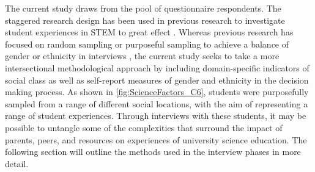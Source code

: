 The current study draws from the pool of questionnaire respondents. The staggered research design has been used in previous research to investigate student experiences in STEM to great effect \citep{grossman2014perceived,russell2011factors}. Whereas previous research has focused on random sampling \cite{russell2011factors} or purposeful sampling to achieve a balance of gender or ethnicity in interviews \citep{grossman2014perceived}, the current study seeks to take a more intersectional methodological approach by including domain-specific indicators of social class as well as self-report measures of gender and ethnicity in the decision making process. As shown in \ref{fig:ScienceFactors_C6}, students were purposefully sampled from a range of different social locations, with the aim of representing a range of student experiences. Through interviews with these students, it may be possible to untangle some of the complexities that surround the impact of parents, peers, and resources on experiences of university science education. The following section will outline the methods used in the interview phases in more detail.


